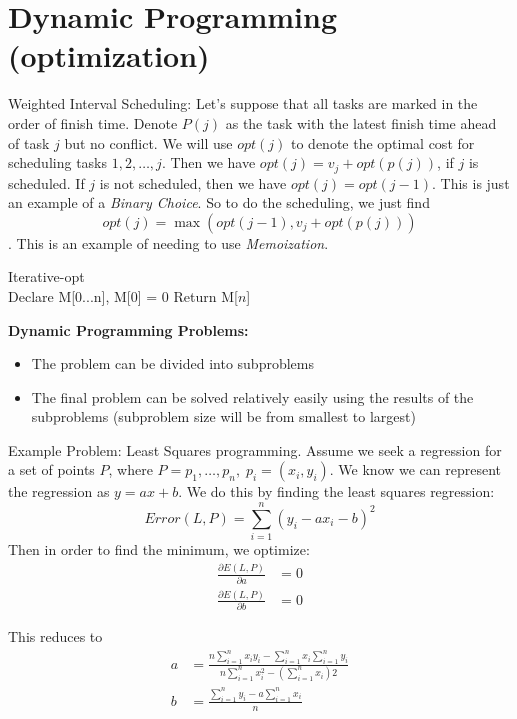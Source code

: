 \documentclass[11pt,letterpaper]{article}
\begin{document}
\section{Dynamic Programming (optimization)}
Weighted Interval Scheduling: Let's suppose that all tasks are marked in the order of finish time. Denote $P(j)$ as the task with the latest finish time ahead of task $j$ but no conflict. We will use $opt(j)$ to denote the optimal cost for scheduling tasks $1, 2, \ldots, j$. Then we have $opt(j) = v_j + opt(p(j))$, if $j$ is scheduled. If $j$ is not scheduled, then we have $opt(j) = opt(j-1)$. This is just an example of a \textit{Binary Choice}. So to do the scheduling, we just find $$opt(j) = \max ( opt(j-1), v_j + opt(p(j)))$$. This is an example of needing to use \textit{Memoization}. 

\begin{algorithm}[H]
	Iterative-opt \\
	Declare M[0...n], M[0] = 0\;
	Return M[$n$]\;
\end{algorithm}

\textbf{Dynamic Programming Problems:}
\begin{itemize}
	\item The problem can be divided into subproblems
	\item The final problem can be solved relatively easily using the results of the subproblems (subproblem size will be from smallest to largest)
\end{itemize}

Example Problem: Least Squares programming. Assume we seek a regression for a set of points $P$, where $P = {p_1, \ldots, p_n}, \; p_i = (x_i, y_i)$. We know we can represent the regression as $y = a x + b$. We do this by finding the least squares regression:
\[
Error(L,P) = \sum_{i=1}^n (y_i - ax_i -b)^2
\]
Then in order to find the minimum, we optimize:
\begin{align*}
\frac{\partial E(L,P)}{\partial a} &= 0 \\
\frac{\partial E(L,P)}{\partial b} &= 0
\end{align*}

This reduces to 
\begin{align*}
	a &= \frac{n\sum_{i=1}^n x_i y_i - \sum_{i=1}^n x_i \sum_{i=1}^n y_i}{n \sum_{i=1}^nx_i^2 - (\sum_{i=1}^n x_i)2} \\
	b &= \frac{\sum_{i=1}^n y_i - a \sum_{i=1}^n x_i}{n}
\end{align*}
\end{document}
